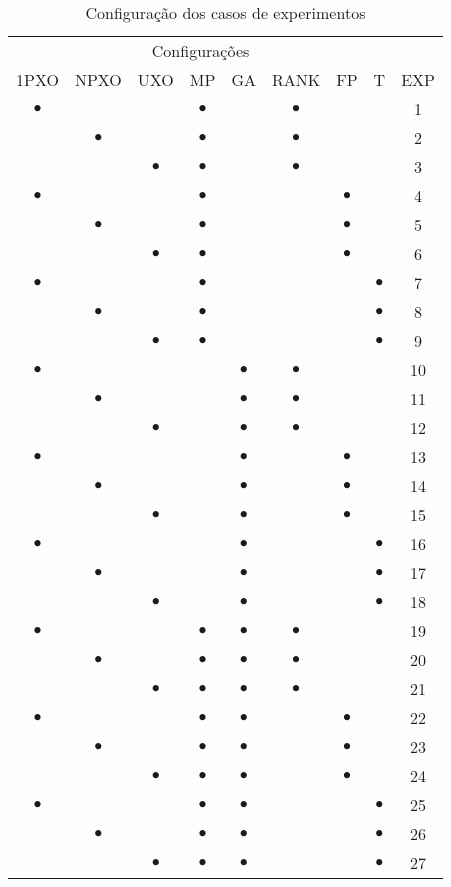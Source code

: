 \documentclass[relatorio,nocolorlinks]{inf-ufg}
\begin{document}
\newcommand{\x}{$\bullet$}
\begin{table*}[hp]
\caption{Configura\c{c}\~{a}o dos casos de experimentos}
\centering
\label{experimentos}
\begin{tabular}{ccccccccc}
\toprule
\multicolumn{8}{c}{Configura\c{c}\~{o}es} \\
\cmidrule(c){1-8}
 1PXO & NPXO & UXO &  MP  &  GA  & RANK &  FP  &  T  & EXP \\
\midrule
 \x   &      &     &  \x  &      &  \x  &      &     &  1  \\
      &  \x  &     &  \x  &      &  \x  &      &     &  2  \\
      &      & \x  &  \x  &      &  \x  &      &     &  3  \\
 \x   &      &     &  \x  &      &      &  \x  &     &  4  \\
      &  \x  &     &  \x  &      &      &  \x  &     &  5  \\
      &      & \x  &  \x  &      &      &  \x  &     &  6  \\
 \x   &      &     &  \x  &      &      &      & \x  &  7  \\
      &  \x  &     &  \x  &      &      &      & \x  &  8  \\
      &      & \x  &  \x  &      &      &      & \x  &  9  \\
 \x   &      &     &      &  \x  &  \x  &      &     &  10 \\
      &  \x  &     &      &  \x  &  \x  &      &     &  11 \\
      &      & \x  &      &  \x  &  \x  &      &     &  12 \\
 \x   &      &     &      &  \x  &      &  \x  &     &  13 \\
      &  \x  &     &      &  \x  &      &  \x  &     &  14 \\
      &      & \x  &      &  \x  &      &  \x  &     &  15 \\
 \x   &      &     &      &  \x  &      &      & \x  &  16 \\
      &  \x  &     &      &  \x  &      &      & \x  &  17 \\
      &      & \x  &      &  \x  &      &      & \x  &  18 \\
 \x   &      &     &  \x  &  \x  &  \x  &      &     &  19 \\
      &  \x  &     &  \x  &  \x  &  \x  &      &     &  20 \\
      &      & \x  &  \x  &  \x  &  \x  &      &     &  21 \\
 \x   &      &     &  \x  &  \x  &      &  \x  &     &  22 \\
      &  \x  &     &  \x  &  \x  &      &  \x  &     &  23 \\
      &      & \x  &  \x  &  \x  &      &  \x  &     &  24 \\
 \x   &      &     &  \x  &  \x  &      &      & \x  &  25 \\
      &  \x  &     &  \x  &  \x  &      &      & \x  &  26 \\
      &      & \x  &  \x  &  \x  &      &      & \x  &  27 \\
\bottomrule
\end{tabular}
\end{table*}
\end{document}
